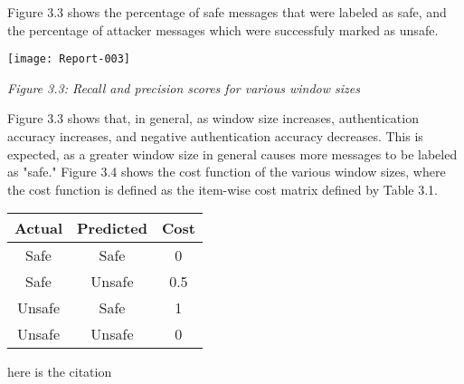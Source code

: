 \documentclass[12pt]{article}
\begin{document}
Figure 3.3 shows the percentage of safe messages that were labeled as safe, and the percentage of attacker messages which were successfuly marked as unsafe.

\begin{center}
\texttt{[image: Report-003]}

\textit{Figure 3.3: Recall and precision scores for various window sizes}
\end{center}

Figure 3.3 shows that, in general, as window size increases, authentication accuracy increases, and negative authentication accuracy decreases. This is expected, as a greater window size in general causes more messages to be labeled as "safe." Figure 3.4 shows the cost function of the various window sizes, where the cost function is defined as the item-wise cost matrix defined by Table 3.1.

\begin{center}
\begin{tabular}{|c|c|c|}
\hline
Actual & Predicted & Cost \\ \hline
Safe & Safe & 0 \\
Safe & Unsafe & 0.5 \\
Unsafe & Safe & 1 \\
Unsafe & Unsafe & 0 \\
\hline
\end{tabular}
\end{center}

\begin{thebibliography}{9} 

 here is the citation


\end{thebibliography} 
\end{document}
